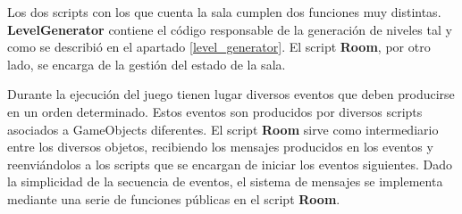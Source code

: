 Los dos scripts con los que cuenta la sala cumplen dos funciones muy distintas. \textbf{LevelGenerator} contiene el código responsable de la generación de niveles tal y como se describió en el apartado \ref{level_generator}. El script \textbf{Room}, por otro lado, se encarga de la gestión del estado de la sala.

Durante la ejecución del juego tienen lugar diversos eventos que deben producirse en un orden determinado. Estos eventos son producidos por diversos scripts asociados a GameObjects diferentes. El script \textbf{Room} sirve como intermediario entre los diversos objetos, recibiendo los mensajes producidos en los eventos y reenviándolos a los scripts que se encargan de iniciar los eventos siguientes. Dado la simplicidad de la secuencia de eventos, el sistema de mensajes se implementa mediante una serie de funciones públicas en el script \textbf{Room}.

